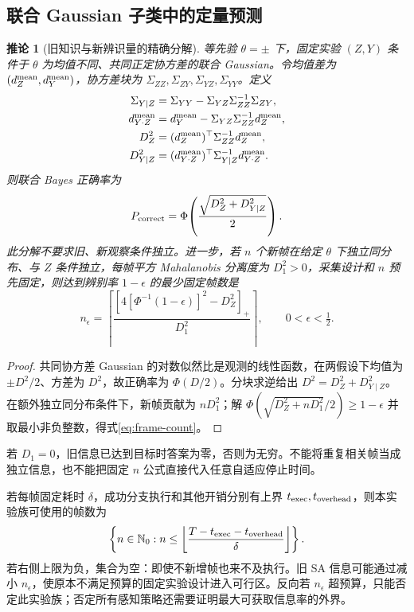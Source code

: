 \documentclass[11pt,a4paper,fontset=fandol]{ctexart}
\newtheorem{corollary}[theorem]{推论}
\theoremstyle{definition}
\theoremstyle{remark}
\numberwithin{equation}{section}
\newcommand{\N}{\mathbb N}
\newcommand{\pos}[1]{\left[#1\right]_+}
\begin{document}
\subsection{联合 Gaussian 子类中的定量预测}
\begin{corollary}[旧知识与新辨识量的精确分解]
\label{cor:gaussian}
等先验 $\theta=\pm$ 下，固定实验 $(Z,Y)$ 条件于 $\theta$ 为均值不同、共同正定协方差的联合 Gaussian。令均值差为 $(d_Z^{\rm mean},d_Y^{\rm mean})$，协方差块为 $\Sigma_{ZZ},\Sigma_{ZY},\Sigma_{YZ},\Sigma_{YY}$。定义
\begin{align}
 \Sigma_{Y\mid Z}&=\Sigma_{YY}-\Sigma_{YZ}\Sigma_{ZZ}^{-1}\Sigma_{ZY},\\
 d_{Y\cdot Z}^{\rm mean}
 &=d_Y^{\rm mean}-\Sigma_{YZ}\Sigma_{ZZ}^{-1}d_Z^{\rm mean},\\
 D_Z^2&=(d_Z^{\rm mean})^\top\Sigma_{ZZ}^{-1}d_Z^{\rm mean},\\
 D_{Y\mid Z}^2&=(d_{Y\cdot Z}^{\rm mean})^\top
 \Sigma_{Y\mid Z}^{-1}d_{Y\cdot Z}^{\rm mean}.
\end{align}
则联合 Bayes 正确率为
\begin{equation}
 P_{\rm correct}=\Phi\!\left(\frac{\sqrt{D_Z^2+D_{Y\mid Z}^2}}2\right).
 \label{eq:gaussian}
\end{equation}
此分解不要求旧、新观察条件独立。进一步，若 $n$ 个新帧在给定 $\theta$ 下独立同分布、与 $Z$ 条件独立，每帧平方 Mahalanobis 分离度为 $D_1^2>0$，采集设计和 $n$ 预先固定，则达到辨别率 $1-\epsilon$ 的最少固定帧数是
\begin{equation}
 \boxed{
 n_\epsilon=
 \left\lceil
 \frac{\pos{4[\Phi^{-1}(1-\epsilon)]^2-D_Z^2}}{D_1^2}
 \right\rceil,\qquad 0<\epsilon<\tfrac12.}
 \label{eq:frame-count}
\end{equation}
\end{corollary}
\begin{proof}
共同协方差 Gaussian 的对数似然比是观测的线性函数，在两假设下均值为 $\pm D^2/2$、方差为 $D^2$，故正确率为 $\Phi(D/2)$。分块求逆给出 $D^2=D_Z^2+D_{Y\mid Z}^2$。在额外独立同分布条件下，新帧贡献为 $nD_1^2$；解 $\Phi(\sqrt{D_Z^2+nD_1^2}/2)\ge1-\epsilon$ 并取最小非负整数，得式\eqref{eq:frame-count}。
\end{proof}

若 $D_1=0$，旧信息已达到目标时答案为零，否则为无穷。不能将重复相关帧当成独立信息，也不能把固定 $n$ 公式直接代入任意自适应停止时间。

若每帧固定耗时 $\delta$，成功分支执行和其他开销分别有上界 $t_{\rm exec},t_{\rm overhead}$，则本实验族可使用的帧数为
\begin{equation}
 \left\{n\in\N_0:
 n\le
 \left\lfloor
 \frac{T-t_{\rm exec}-t_{\rm overhead}}{\delta}
 \right\rfloor
 \right\}.
 \label{eq:nmax}
\end{equation}
若右侧上限为负，集合为空：即使不新增帧也来不及执行。旧 SA 信息可能通过减小 $n_\epsilon$，使原本不满足预算的固定实验设计进入可行区。反向若 $n_\epsilon$ 超预算，只能否定此实验族；否定所有感知策略还需要证明最大可获取信息率的外界。
\end{document}
